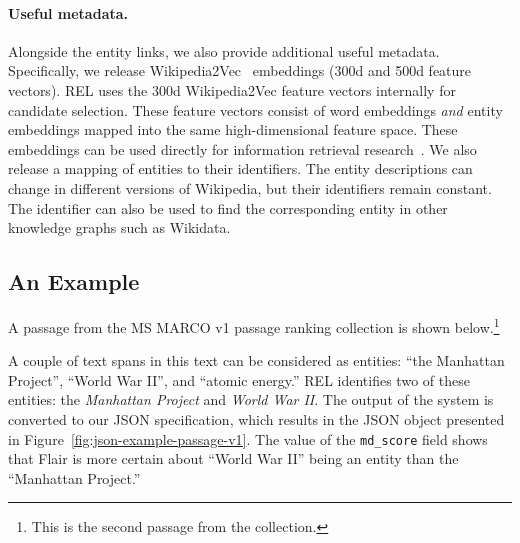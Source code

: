 \paragraph{Useful metadata.} Alongside the entity links, we also provide additional useful metadata. Specifically, we release Wikipedia2Vec~\citep{wikipedia2vec} embeddings (300d and 500d feature vectors). REL uses the 300d Wikipedia2Vec feature vectors internally for candidate selection. These feature vectors consist of word embeddings \emph{and} entity embeddings mapped into the same high-dimensional feature space. These embeddings can be used directly for information retrieval research~\citep{Gerritse:2020:GEER, Gerritse22}. We also release a mapping of entities to their identifiers. The entity descriptions can change in different versions of Wikipedia, but their identifiers remain constant.
The identifier can also be used to find the corresponding entity in other knowledge graphs such as Wikidata.

\subsection{An Example}
A passage from the MS MARCO v1 passage ranking collection is shown below.\footnote{This is the second passage from the collection.}

\smallskip
\begin{center}
\end{center}
\smallskip

A couple of text spans in this text can be considered as entities: ``the Manhattan Project'', ``World War II'', and ``atomic energy.'' REL identifies two of these entities: the \emph{Manhattan Project} and \emph{World War II}. 
The output of the system is converted to our JSON specification, which results in the JSON object presented in Figure~\ref{fig:json-example-passage-v1}. The value of the \texttt{md\_score} field shows that Flair is more certain about ``World War II'' being an entity than the ``Manhattan Project.'' 

